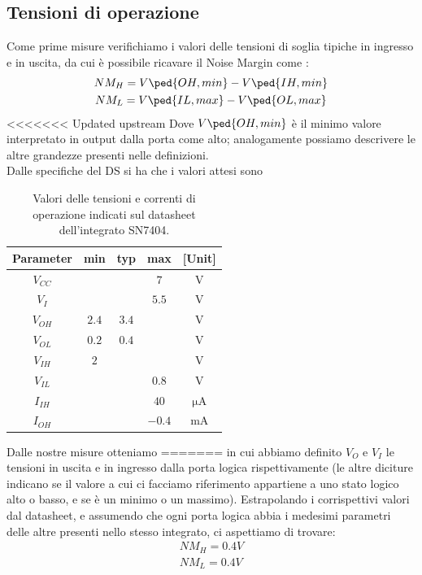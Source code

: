 \documentclass[10pt, a4paper, italian]{article}
\begin{document}
\subsection{Tensioni di operazione}
\label{TENSIONI}
Come prime misure verifichiamo i valori delle tensioni di soglia tipiche in ingresso e in uscita, da cui è possibile ricavare il Noise Margin come :
\begin{gather*}
    NM_H = V\ped{OH, min} - V\ped{IH, min}\\
    NM_L = V\ped{IL,max} - V\ped{OL, max}
\end{gather*}
<<<<<<< Updated upstream
Dove $V\ped{OH, min}$ è il minimo valore interpretato in output dalla porta come alto; analogamente possiamo descrivere le altre grandezze presenti nelle definizioni.\\
Dalle specifiche del DS si ha che i valori attesi sono %
\begin{table}[htb]
\centering
\begin{tabular}{cccc|c}
\toprule
Parameter  & min & typ & max & [Unit] \\
\midrule
\midrule
$V_{CC}$ &  &  & $7$ & V \\
$V_I$	 &  &  & $5.5$ & V\\
$V_{OH}$ & $2.4$  & $3.4$ & & V \\
$V_{OL}$ & $0.2$  & $0.4$ & & V \\
$V_{IH}$ & $2$  &  & & V  \\
$V_{IL}$ &  &  & $0.8$ & V \\
$I_{IH}$ &  &  & $40$ & $\si{\micro\A}$ \\
$I_{OH}$ &  &  & $-0.4$ & mA \\
\bottomrule 
\end{tabular}

\caption{Valori delle tensioni e correnti di operazione indicati sul
datasheet dell'integrato SN7404.}
\label{tab: notDS}
\end{table}

Dalle nostre misure otteniamo %
=======
in cui abbiamo definito $V_O$ e $V_I$ le tensioni in uscita e in ingresso dalla porta logica rispettivamente (le altre diciture indicano se il valore a cui ci facciamo riferimento appartiene a uno stato logico alto o basso, e se è un minimo o un massimo).
Estrapolando i corrispettivi valori dal datasheet, e assumendo che ogni porta logica abbia i medesimi parametri delle altre presenti nello stesso integrato, ci aspettiamo di trovare:
\begin{gather*}
    NM_H=0.4 V\\
    NM_L=0.4 V
\end{gather*}
\end{document}
